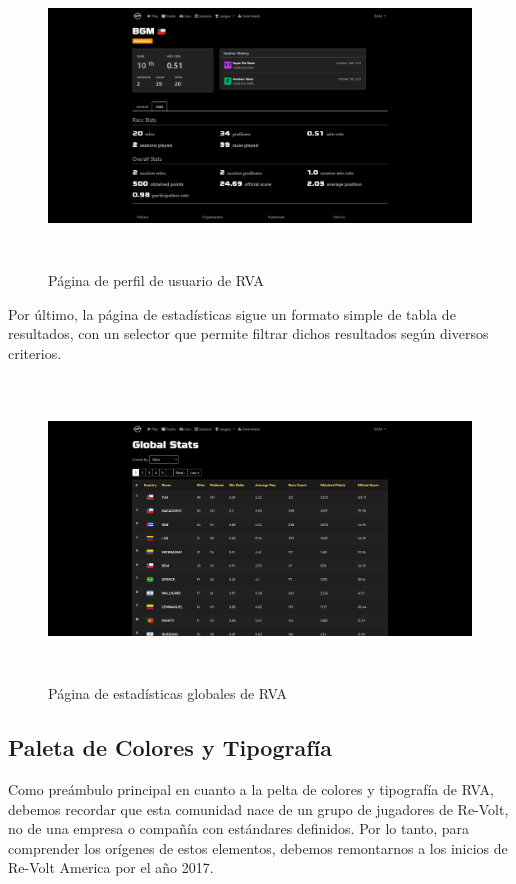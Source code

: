 \begin{figure}[H]
  \begin{center}
    \includegraphics[width=15cm, height=8cm]{img/profile1.png} 
  \end{center}
  \caption[Página de perfil de usuario de RVA]{Página de perfil de usuario de RVA}
  \label{fig:profile}
\end{figure}

Por último, la página de estadísticas sigue un formato simple de tabla de resultados, con un selector que permite filtrar dichos resultados según diversos criterios.

\begin{figure}[H]
  \begin{center}
    \includegraphics[width=15cm, height=8cm]{img/stats.png} 
  \end{center}
  \caption[Página de estadísticas globales de RVA]{Página de estadísticas globales de RVA}
  \label{fig:stats}
\end{figure}

\subsection{Paleta de Colores y Tipografía}
Como preámbulo principal en cuanto a la pelta de colores y tipografía de RVA, debemos recordar que esta comunidad nace de un grupo de jugadores de Re-Volt, no de una empresa o compañía con estándares definidos. Por lo tanto, para comprender los orígenes de estos elementos, debemos remontarnos a los inicios de Re-Volt America por el año 2017.

